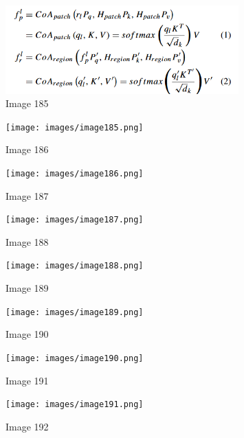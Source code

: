 \documentclass{article}%
\begin{document}
%


\begin{figure}[h!]%
\centering%
\includegraphics[width=0.8\textwidth]{images/image184.png}%
\caption{Image 185}%
\end{figure}

%


\begin{figure}[h!]%
\centering%
\texttt{[image: images/image185.png]}%
\caption{Image 186}%
\end{figure}

%


\begin{figure}[h!]%
\centering%
\texttt{[image: images/image186.png]}%
\caption{Image 187}%
\end{figure}

%


\begin{figure}[h!]%
\centering%
\texttt{[image: images/image187.png]}%
\caption{Image 188}%
\end{figure}

%


\begin{figure}[h!]%
\centering%
\texttt{[image: images/image188.png]}%
\caption{Image 189}%
\end{figure}

%


\begin{figure}[h!]%
\centering%
\texttt{[image: images/image189.png]}%
\caption{Image 190}%
\end{figure}

%


\begin{figure}[h!]%
\centering%
\texttt{[image: images/image190.png]}%
\caption{Image 191}%
\end{figure}

%


\begin{figure}[h!]%
\centering%
\texttt{[image: images/image191.png]}%
\caption{Image 192}%
\end{figure}
\end{document}
